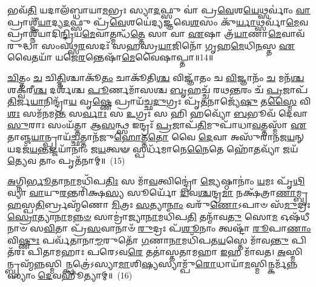𑌭𑌵᳴\-\ul{𑌤𑌿} 𑌯𑌦𑌾𑌲᳴𑌬𑍍𑌧𑌾𑌯𑌾\-\ul{𑌮}\-𑌭𑍍𑌰𑌃 𑌸𑍍𑌯𑌾\-\ul{𑌦}\-𑌫𑍍𑌸𑍁 𑌵𑌾॑ 𑌪𑍍𑌰\-\ul{𑌵𑍇}\-𑌶\-\ul{𑌯𑍇}\-𑌥𑍍𑌸𑌰𑍍𑌵𑌾𑌂॑ \ul{𑌵𑌾} 𑌪𑍍𑌰𑌾𑌶𑍍𑌨𑍀᳴\-\ul{𑌯𑌾}\-𑌦𑍍𑌯\-\ul{𑌦}\-𑌫𑍍𑌸𑍁 𑌪𑍍𑌰᳴\-\ul{𑌵𑍇}\-𑌶𑌯𑍇॑𑌦𑍍𑌯𑌜𑍍𑌞𑌵𑍇\-\ul{𑌶}\-𑌸𑌂 𑌕𑍁᳴\-\ul{𑌰𑍍𑌯𑌾}\-𑌥𑍍𑌸𑌰𑍍𑌵𑌾᳴\-\ul{𑌮𑍇}\-𑌵 𑌪𑍍𑌰𑌾𑌶𑍍𑌨𑍀᳴𑌯𑌾𑌦𑌿\-\ul{𑌨𑍍𑌦𑍍𑌰𑌿}\-𑌯\-\ul{𑌮𑍇}\-𑌵𑌾𑌤𑍍𑌮𑌨𑍍𑌧᳴\-\ul{𑌤𑍍𑌤𑍇} 𑌸𑌾 𑌵𑌾 \ul{𑌏}\-𑌷𑌾 𑌤𑍍𑌰᳴\-\ul{𑌯𑌾}\-𑌣𑌾\-\ul{𑌮𑍇}\-𑌵𑌾𑌵᳴𑌰𑍁𑌦𑍍𑌧𑌾 𑌸𑌂𑌵𑌥𑍍𑌸\-\ul{𑌰}\-𑌸𑌦𑌃᳴ 𑌸𑌹𑌸𑍍𑌰\-\ul{𑌯𑌾}\-𑌜𑌿𑌨𑍋᳴ 𑌗𑍃𑌹\-\ul{𑌮𑍇}\-𑌧𑌿\-\ul{𑌨}\-𑌸𑍍𑌤 \ul{𑌏}\-𑌵𑍈𑌤𑌯𑌾᳴ 𑌯𑌜𑍇\-\ul{𑌰}\-𑌨𑍍𑌤𑍇𑌷𑌾᳴\-\ul{𑌮𑍇}\-𑌵𑍈𑌷𑌾𑌪𑍍𑌤𑌾॥14॥

{\anuvakamend[{𑌯𑌥𑍍𑌸𑍍𑌵𑍇𑌨᳴ 𑌸𑌾𑌰\-\ul{𑌸𑍍𑌵}\-𑌤𑍀𑌮𑌾 𑌲᳴𑌭𑍇\-\ul{𑌤} 𑌯𑌃 𑌕𑌾𑌮𑌾᳴𑌯 \ul{𑌤𑍍𑌵𑌾} 𑌕𑌾𑌮𑍋\-𑌽\-\ul{𑌪} 𑌇\-\ul{𑌤𑍍𑌯}\-𑌭𑍍𑌰𑍋 𑌦𑍍𑌵𑌿𑌚᳴𑌤𑍍𑌵𑌾𑌰𑌿𑍞𑌶𑌚𑍍𑌚}]}%

\-\ul{𑌚𑌿}\-𑌤𑍍𑌤𑌂 \ul{𑌚} 𑌚𑌿\-\ul{𑌤𑍍𑌤𑌿}\-𑌶𑍍𑌚𑌾𑌕𑍂᳴\-\ul{𑌤𑌂} 𑌚𑌾𑌕𑍂᳴𑌤𑌿\-\ul{𑌶𑍍𑌚} 𑌵𑌿𑌜𑍍𑌞𑌾᳴𑌤𑌂 𑌚 \ul{𑌵𑌿}\-𑌜𑍍𑌞𑌾𑌨𑌂᳴ \ul{𑌚} 𑌮𑌨᳴\-\ul{𑌶𑍍𑌚} 𑌶𑌕𑍍𑌵᳴𑌰𑍀\-\ul{𑌶𑍍𑌚} 𑌦𑌰𑍍\mbox{}𑌶᳴𑌶𑍍𑌚 \ul{𑌪𑍂}\-𑌰𑍍𑌣𑌮𑌾᳴𑌸𑌶𑍍𑌚 \ul{𑌬𑍃}\-𑌹𑌚𑍍𑌚᳴ 𑌰𑌥\-\ul{𑌨𑍍𑌤}\-𑌰𑌂 𑌚᳴ \ul{𑌪𑍍𑌰}\-𑌜𑌾𑌪᳴\-\ul{𑌤𑌿}\-𑌰𑍍𑌜\-\ul{𑌯𑌾}\-𑌨𑌿𑌨𑍍𑌦𑍍𑌰𑌾᳴\-\ul{𑌯} 𑌵𑍃\-\ul{𑌷𑍍𑌣𑍇} 𑌪𑍍𑌰𑌾𑌯᳴𑌚𑍍𑌛\-\ul{𑌦𑍁}\-𑌗𑍍𑌰𑌃 𑌪𑍃᳴\-\ul{𑌤}\-𑌨𑌾𑌜𑍍𑌯𑍇᳴\-\ul{𑌷𑍁} 𑌤\-\ul{𑌸𑍍𑌮𑍈} 𑌵𑌿\-\ul{𑌶𑌃} 𑌸𑌮᳴𑌨𑌮\-\ul{𑌨𑍍𑌤} 𑌸\-\ul{𑌰𑍍𑌵𑌾𑌃} 𑌸 \ul{𑌉}\-𑌗𑍍𑌰𑌃 𑌸 𑌹𑌿 𑌹𑌵𑍍𑌯𑍋᳴ \ul{𑌬}\-𑌭𑍂𑌵᳴ 𑌦𑍇𑌵𑌾\-\ul{𑌸𑍁}\-𑌰𑌾𑌃 𑌸𑌂𑌯᳴𑌤𑍍𑌤𑌾 𑌆\-\ul{𑌸}\-𑌨𑍍𑌥𑍍𑌸 𑌇𑌨𑍍𑌦𑍍𑌰𑌃᳴ \ul{𑌪𑍍𑌰}\-𑌜𑌾𑌪᳴\-\ul{𑌤𑌿}\-𑌮𑍁𑌪𑌾᳴𑌧𑌾\-\ul{𑌵}\-𑌤𑍍𑌤𑌸𑍍𑌮𑌾᳴ \ul{𑌏}\-𑌤𑌾𑌞𑍍𑌜\-\ul{𑌯𑌾}\-𑌨𑍍𑌪𑍍𑌰𑌾𑌯᳴\-\ul{𑌚𑍍𑌛}\-𑌤𑍍𑌤𑌾𑌨᳴𑌜𑍁\-\ul{𑌹𑍋}\-𑌤𑍍𑌤\-\ul{𑌤𑍋} 𑌵𑍈 \ul{𑌦𑍇}\-𑌵𑌾 𑌅𑌸𑍁᳴𑌰𑌾𑌨𑌜\-\ul{𑌯}\-𑌨𑍍 𑌯\-𑌦𑌜᳴\-\ul{𑌯}\-𑌨𑍍𑌤𑌜𑍍𑌜𑌯𑌾᳴𑌨𑌾𑌂 𑌜\-\ul{𑌯}\-𑌤𑍍𑌵𑍟 𑌸𑍍𑌪𑌰𑍍𑌧᳴𑌮𑌾𑌨𑍇\-\ul{𑌨𑍈}\-𑌤𑍇 𑌹𑍋᳴\-\ul{𑌤}\-𑌵𑍍𑌯𑌾᳴ 𑌜𑌯᳴\-\ul{𑌤𑍍𑌯𑍇}\-𑌵 𑌤𑌾𑌂 𑌪𑍃𑌤᳴𑌨𑌾𑌮𑍍॥~(15)

{\anuvakamend[{𑌉\-\ul{𑌪} 𑌪𑌞𑍍𑌚᳴𑌵𑌿𑍞𑌶𑌤𑌿𑌶𑍍𑌚}]}%

\-\ul{𑌅}\-𑌗𑍍𑌨𑌿\-\ul{𑌰𑍍𑌭𑍂}\-𑌤𑌾\-\ul{𑌨𑌾}\-𑌮𑌧𑌿᳴𑌪\-\ul{𑌤𑌿𑌃} 𑌸 𑌮𑌾᳴\-\ul{𑌵}\-𑌤𑍍𑌵𑌿𑌨𑍍𑌦𑍍𑌰𑍋॑ \ul{𑌜𑍍𑌯𑍇}\-𑌷𑍍𑌠𑌾𑌨𑌾𑌂॑ \ul{𑌯}\-𑌮𑌃 𑌪𑍃᳴\-\ul{𑌥𑌿}\-𑌵𑍍𑌯𑌾 \ul{𑌵𑌾}\-𑌯𑍁\-\ul{𑌰}\-𑌨𑍍𑌤𑌰𑌿᳴𑌕𑍍𑌷\-\ul{𑌸𑍍𑌯} 𑌸𑍂𑌰𑍍𑌯𑍋᳴ \ul{𑌦𑌿}\-𑌵\-\ul{𑌶𑍍𑌚}\-𑌨𑍍𑌦𑍍𑌰\-\ul{𑌮𑌾} 𑌨𑌕𑍍𑌷᳴𑌤𑍍𑌰𑌾\-\ul{𑌣𑌾}\-𑌮𑍍𑌬𑍃\-\ul{𑌹}\-𑌸𑍍𑌪\-\ul{𑌤𑌿}\-𑌰𑍍𑌬𑍍𑌰𑌹𑍍𑌮᳴𑌣𑍋 \ul{𑌮𑌿}\-𑌤𑍍𑌰𑌃 \ul{𑌸}\-𑌤𑍍𑌯𑌾\-\ul{𑌨𑌾𑌂} 𑌵𑌰𑍁᳴\-\ul{𑌣𑍋}\-\-𑌽𑌪𑌾𑍞 𑌸᳴\-\ul{𑌮𑍁}\-𑌦𑍍𑌰𑌃 \ul{𑌸𑍍𑌰𑍋}\-𑌤𑍍𑌯𑌾\-\ul{𑌨𑌾}\-𑌮\-\ul{𑌨𑍍𑌨}\-\-\ul{𑍞} 𑌸𑌾𑌮𑍍𑌰𑌾॑𑌜𑍍𑌯𑌾\-\ul{𑌨𑌾}\-𑌮𑌧𑌿᳴𑌪\-\ul{𑌤𑌿} 𑌤𑌨𑍍𑌮𑌾᳴𑌵\-\ul{𑌤𑍁} 𑌸𑍋\-\ul{𑌮} 𑌓𑌷᳴𑌧𑍀𑌨𑌾𑍞 𑌸\-\ul{𑌵𑌿}\-𑌤𑌾 𑌪𑍍𑌰᳴\-\ul{𑌸}\-𑌵𑌾𑌨𑌾𑍞᳴ \ul{𑌰𑍁}\-𑌦𑍍𑌰𑌃 𑌪᳴\-\ul{𑌶𑍂}\-𑌨𑌾𑌂 𑌤𑍍𑌵𑌷𑍍𑌟𑌾᳴ \ul{𑌰𑍂}\-𑌪𑌾\-\ul{𑌣𑌾𑌂} 𑌵𑌿\-\ul{𑌷𑍍𑌣𑍁𑌃} 𑌪𑌰𑍍𑌵᳴𑌤𑌾𑌨𑌾\-\ul{𑌮𑍍𑌮}\-𑌰𑍁𑌤𑍋᳴ \ul{𑌗}\-𑌣𑌾\-\ul{𑌨𑌾}\-𑌮𑌧𑌿᳴𑌪𑌤\-\ul{𑌯}\-𑌸𑍍𑌤𑍇 𑌮𑌾᳴𑌵\-\ul{𑌨𑍍𑌤𑍁} 𑌪𑌿𑌤᳴𑌰𑌃 𑌪𑌿𑌤𑌾𑌮𑌹𑌾𑌃 𑌪𑌰𑍇\-𑌽𑌵\-\ul{𑌰𑍇} 𑌤𑌤𑌾॑𑌸𑍍𑌤𑌤𑌾𑌮𑌹𑌾 \ul{𑌇}\-𑌹 𑌮𑌾᳴𑌵𑌤। \ul{𑌅}\-𑌸𑍍𑌮𑌿𑌨𑍍𑌬𑍍𑌰𑌹𑍍𑌮᳴\-\ul{𑌨𑍍𑌨}\-𑌸𑍍𑌮𑌿\-\ul{𑌨𑍍𑌕𑍍𑌷}\-𑌤𑍍𑌰𑍇॑\-𑌽𑌸𑍍𑌯𑌾\-\ul{𑌮𑌾}\-𑌶𑌿\-\ul{𑌷𑍍𑌯}\-𑌸𑍍𑌯𑌾𑌮𑍍𑌪𑍁᳴\-\ul{𑌰𑍋}\-𑌧𑌾𑌯𑌾᳴\-\-\ul{𑌮}\-𑌸𑍍𑌮𑌿𑌨𑍍𑌕𑌰𑍍𑌮᳴\-\ul{𑌨𑍍𑌨}\-𑌸𑍍𑌯𑌾𑌂 \ul{𑌦𑍇}\-𑌵𑌹𑍂॑𑌤𑍍𑌯𑌾𑌮𑍍॥~(16)

